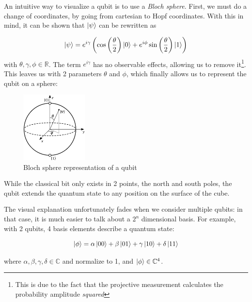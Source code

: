 \documentclass[12pt]{memoir}
\newcommand{\ti}{\textit}
\begin{document}
An intuitive way to visualize a qubit is to use a \ti{Bloch sphere}. First, we must do a change of coordinates, by going from cartesian to Hopf coordinates. With this in mind, it can be shown that $\ket \psi$ can be rewritten as

\begin{equation}
    \ket \psi = e^{i\gamma}\left( \cos\left(\frac{\theta}{2}\right)\ket 0 + e^{i\phi} \sin\left(\frac{\theta}{2}\right)\ket 1\right)
\end{equation}
with $\theta,\gamma,\phi \in \mathbb{R}$. The term $e^{i\gamma}$ has no observable effects, allowing us to remove it\footnote{This is due to the fact that the projective measurement calculates the probability amplitude \textit{squared}}. This leaves us with 2 parameters $\theta$ and $\phi$, which finally allows us to represent the qubit on a sphere:

\begin{figure}[H]
    \centering
    \includegraphics[width=0.3\textwidth]{figures/bloch_sphere.png}
    \caption{Bloch sphere representation of a qubit \cite{wiki:qubit}}
    \label{fig:bloch-sphere}
\end{figure}
While the classical bit only exists in 2 points, the north and south poles, the qubit extends the quantum state to any position on the surface of the cube. \cite{wiki:qubit,book:Nielsen-Chuang-2010}\medbreak

The visual explanation unfortunately fades when we consider multiple qubits: in that case, it is much easier to talk about a $2^n$ dimensional basis. For example, with 2 qubits, 4 basis elements describe a quantum state:

\begin{equation}
    \ket{\phi} = \alpha \ket{00} + \beta \ket{01} + \gamma \ket{10} + \delta \ket{11}
\end{equation}

where $\alpha,\beta,\gamma,\delta \in \mathbb C$ and normalize to 1, and $\ket{\phi} \in \mathbb{C}^4$.\medbreak
\end{document}

